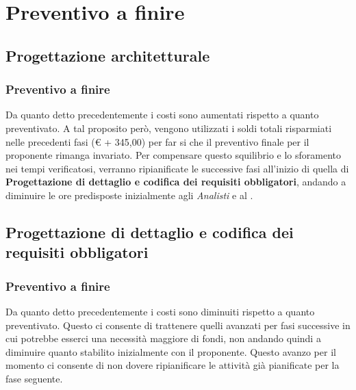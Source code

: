 %


\section{Preventivo a finire} %

	\subsection{Progettazione architetturale} %

		\subsubsection{Preventivo a finire} %
		Da quanto detto precedentemente i costi sono aumentati rispetto a quanto preventivato. A tal proposito però, vengono utilizzati i soldi totali risparmiati nelle precedenti fasi (\euro{} + 345,00) per far si che il preventivo finale per il proponente rimanga invariato. \newline
		Per compensare questo squilibrio e lo sforamento nei tempi verificatosi, verranno ripianificate le successive fasi all'inizio di quella di \textbf{Progettazione di dettaglio e codifica dei requisiti obbligatori}, andando a diminuire le ore predisposte inizialmente agli \emph{Analisti} e al \roleProjectManager.



	\subsection{Progettazione di dettaglio e codifica dei requisiti obbligatori} %

		\subsubsection{Preventivo a finire} %
		Da quanto detto precedentemente i costi sono diminuiti rispetto a quanto preventivato. Questo ci consente di trattenere quelli avanzati per fasi successive in cui potrebbe esserci una necessità maggiore di fondi, non andando quindi a diminuire quanto stabilito inizialmente con il proponente. \newline
		Questo avanzo per il momento ci consente di non dovere ripianificare le attività già pianificate per la fase seguente.



